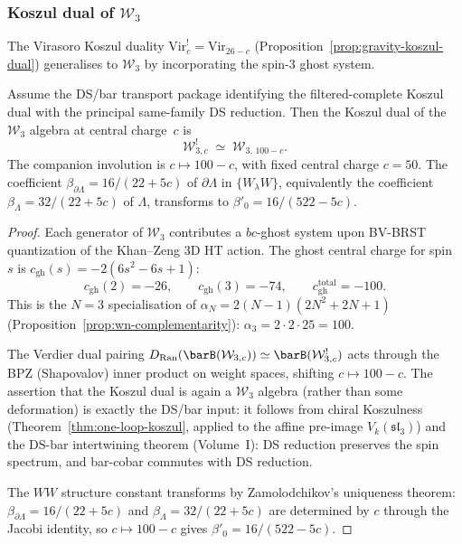 \subsubsection{Koszul dual of $\mathcal{W}_3$}
\label{subsubsec:w3-koszul-dual}
%
%

The Virasoro Koszul duality $\mathrm{Vir}_c^! = \mathrm{Vir}_{26-c}$
(Proposition~\ref{prop:gravity-koszul-dual})
generalises to $\mathcal{W}_3$ by incorporating the spin-$3$ ghost
system.

\begin{theorem}
\label{thm:w3-koszul-dual}
Assume the DS/bar transport package identifying the filtered-complete
Koszul dual with the principal same-family DS reduction. Then the
Koszul dual of the $\mathcal{W}_3$ algebra at central charge~$c$ is
\begin{equation}
\label{eq:w3-koszul-dual}
\mathcal{W}_{3,c}^!
\;\simeq\;
\mathcal{W}_{3,\,100-c}.
\end{equation}
The companion involution is $c \mapsto 100 - c$, with fixed central
charge $c = 50$. The coefficient
$\beta_{\partial\Lambda} = 16/(22+5c)$ of $\partial\Lambda$ in
$\{W_\lambda W\}$, equivalently the coefficient
$\beta_{\Lambda}=32/(22+5c)$ of $\Lambda$, transforms
to $\beta'_0 = 16/(522 - 5c)$.
\end{theorem}

\begin{proof}
Each generator of $\mathcal{W}_3$ contributes a $bc$-ghost system
upon BV-BRST quantization of the Khan--Zeng 3D HT action.
The ghost central charge for spin~$s$ is
$c_{\mathrm{gh}}(s) = -2(6s^2 - 6s + 1)$:
\[
c_{\mathrm{gh}}(2) = -26, \qquad
c_{\mathrm{gh}}(3) = -74, \qquad
c_{\mathrm{gh}}^{\mathrm{total}} = -100.
\]
This is the $N = 3$ specialisation of
$\alpha_N = 2(N{-}1)(2N^2{+}2N{+}1)$
(Proposition~\ref{prop:wn-complementarity}):
$\alpha_3 = 2 \cdot 2 \cdot 25 = 100$.

The Verdier dual pairing $D_{\mathrm{Ran}}(\barB(\mathcal{W}_{3,c}))
\simeq \barB(\mathcal{W}_{3,c}^!)$ acts through the BPZ
(Shapovalov) inner product on weight spaces, shifting $c \mapsto 100 - c$.
The assertion that the Koszul dual is again a $\mathcal{W}_3$ algebra
(rather than some deformation) is exactly the DS/bar input:
it follows from chiral Koszulness
(Theorem~\ref{thm:one-loop-koszul}, applied to the affine
pre-image $V_k(\mathfrak{sl}_3)$) and the DS-bar intertwining
theorem (Volume~I): DS reduction preserves the spin spectrum,
and bar-cobar commutes with DS reduction.

The $WW$ structure constant transforms by Zamolodchikov's
uniqueness theorem: $\beta_{\partial\Lambda}=16/(22+5c)$ and
$\beta_{\Lambda}=32/(22+5c)$ are determined by $c$ through the
Jacobi identity, so $c \mapsto 100 - c$ gives
$\beta'_0 = 16/(522 - 5c)$.
\end{proof}

